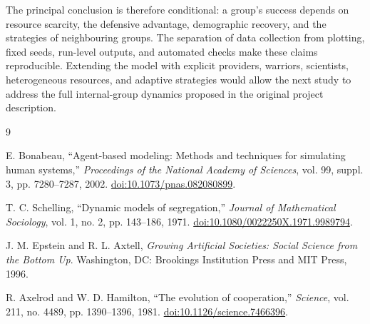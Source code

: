 \documentclass[10pt,twocolumn]{article}
\begin{document}
The principal conclusion is therefore conditional: a group's success depends
on resource scarcity, the defensive advantage, demographic recovery, and the
strategies of neighbouring groups.  The separation of data collection from
plotting, fixed seeds, run-level outputs, and automated checks make these
claims reproducible.  Extending the model with explicit providers, warriors,
scientists, heterogeneous resources, and adaptive strategies would allow the
next study to address the full internal-group dynamics proposed in the
original project description.

\begin{thebibliography}{9}

E. Bonabeau,
``Agent-based modeling: Methods and techniques for simulating human systems,''
\emph{Proceedings of the National Academy of Sciences}, vol. 99, suppl. 3,
pp. 7280--7287, 2002.
\href{https://doi.org/10.1073/pnas.082080899}{doi:10.1073/pnas.082080899}.

T. C. Schelling,
``Dynamic models of segregation,''
\emph{Journal of Mathematical Sociology}, vol. 1, no. 2, pp. 143--186, 1971.
\href{https://doi.org/10.1080/0022250X.1971.9989794}{doi:10.1080/0022250X.1971.9989794}.

J. M. Epstein and R. L. Axtell,
\emph{Growing Artificial Societies: Social Science from the Bottom Up}.
Washington, DC: Brookings Institution Press and MIT Press, 1996.

R. Axelrod and W. D. Hamilton,
``The evolution of cooperation,''
\emph{Science}, vol. 211, no. 4489, pp. 1390--1396, 1981.
\href{https://doi.org/10.1126/science.7466396}{doi:10.1126/science.7466396}.

\end{thebibliography}
\end{document}
